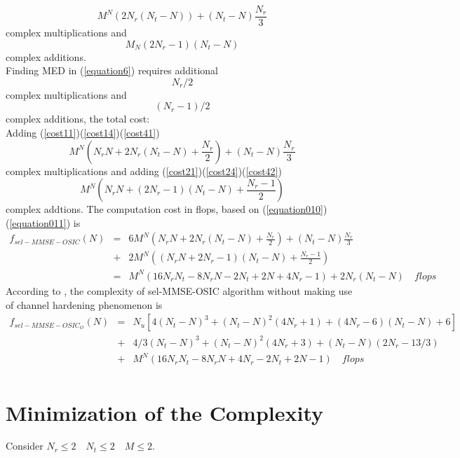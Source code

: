 \documentclass[12pt,a4paper,final]{article}
\begin{document}
\begin{spacing}{2.5}
\begin{equation}
M^{N}(2N_{r}(N_{t}-N))+(N_{t}-N)\frac{N_{r}}{3}\label{cost14}
\end{equation} 
complex multiplications and
\begin{equation}
M_{N}(2N_{r}-1)(N_{t}-N)\label{cost24}
\end{equation}
complex additions.\\
Finding MED in (\ref{equation6}) requires additional 
\begin{equation}
N_{r}/2     \label{cost41}
\end{equation}
complex multiplications and 
\begin{equation}
(N_{r}-1)/2  \label{cost42}
\end{equation}
complex additions, the total cost:\\
Adding (\ref{cost11})(\ref{cost14})(\ref{cost41})
\begin{equation}
M^{N}(N_{r}N+2N_{r}(N_{t}-N)+\frac{N_{r}}{2})+(N_{t}-N)\frac{N_{r}}{3}\label{equation010}
\end{equation}
complex multiplications and adding (\ref{cost21})(\ref{cost24})(\ref{cost42})
\begin{equation}
M^{N}(N_{r}N+(2N_{r}-1)(N_{t}-N)+\frac{N_{r}-1}{2})\label{equation011}
\end{equation}
complex addtions.
The computation cost in flops, based on (\ref{equation010})(\ref{equation011}) is
\begin{eqnarray}
f_{sel-MMSE-OSIC}(N) &=& 6M^{N}(N_{r}N+2N_{r}(N_{t}-N)+\frac{N_{r}}{2})+(N_{t}-N)\frac{N_{r}}{3}\\
\nonumber
&+&2M^{N}((N_{r}N+2N_{r}-1)(N_{t}-N)+\frac{N_{r}-1}{2})\\
\nonumber
&=&M^{N}(16N_{r}N_{t}-8N_{r}N-2N_{t}+2N+4N_{r}-1)+2N_{r}(N_{t}-N)\quad flops\label{flop2}
\end{eqnarray}
According to \cite{2}, the complexity of sel-MMSE-OSIC algorithm without making use of channel hardening phenomenon is 
\begin{eqnarray}
\nonumber
f_{sel-MMSE-OSIC_{O}}(N)&=& N_u[4(N_{t}-N)^{3}+(N_{t}-N)^{2}(4N_{r}+1)+(4N_{r}-6)(N_{t}-N)+6]\\
\nonumber
&+&4/3(N_{t}-N)^{3}+(N_{t}-N)^{2}(4N_{r}+3)+(N_{t}-N)(2N_{r}-13/3)\\
\nonumber
&+&M^{N}(16N_{r}N_{t}-8N_{r}N+4N_{r}-2N_{t}+2N-1)\quad flops\\
\end{eqnarray}
\section{Minimization of the Complexity}\label{minimization}
Consider $N_{r}\leq 2\quad N_{t}\leq 2\quad M\leq 2$. 

\end{spacing}
\end{document}
